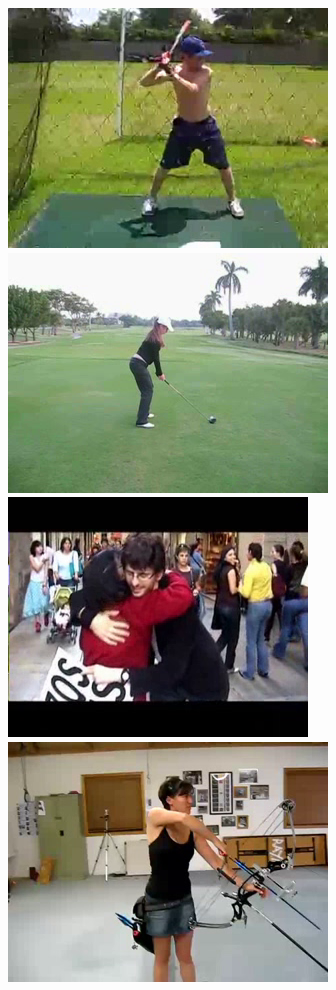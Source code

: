 \documentclass[10pt,twocolumn,letterpaper]{article}
\begin{document}
\begin{figure}[!t]
\begin{center}
\includegraphics[scale=0.20]{figures/dataset_thumb/hmdb/class2.png}
\includegraphics[scale=0.20]{figures/dataset_thumb/hmdb/class3.png} 
\includegraphics[scale=0.20]{figures/dataset_thumb/hmdb/class4.png} 
\includegraphics[scale=0.20]{figures/dataset_thumb/hmdb/class5.png} 

\end{center}
\end{figure}
\end{document}
